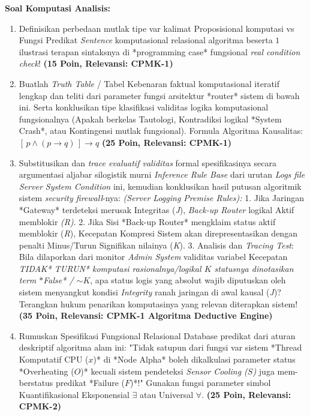 \documentclass[../main.tex]{subfiles}
\begin{document}
\textbf{Soal Komputasi Analisis:}
\begin{enumerate}
    \item Definisikan perbedaan mutlak tipe var kalimat Proposisional komputasi vs Fungsi Predikat \textit{Sentence} komputasional relasional algoritma beserta $1$ ilustrasi terapan sintaksnya di *programming case* fungsional \textit{real condition check}! \textbf{(15 Poin, Relevansi: CPMK-1)}
    \item Buatlah \textit{Truth Table} / Tabel Kebenaran faktual komputasional iteratif lengkap dan teliti dari parameter fungsi arsitektur *router* sistem di bawah ini. Serta konklusikan tipe klasifikasi validitas logika komputasional fungsionalnya (Apakah berkelas Tautologi, Kontradiksi logikal *System Crash*, atau Kontingensi mutlak fungsional).
    Formula Algoritma Kausalitas: $[\,p \land (p \rightarrow q)\,] \rightarrow q$
    \textbf{(25 Poin, Relevansi: CPMK-1)}
    \item Substitusikan dan \textit{trace evaluatif validitas} formal spesifikasinya secara argumentasi aljabar silogistik murni \textit{Inference Rule Base} dari urutan \textit{Logs file Server System Condition} ini, kemudian konklusikan hasil putusan algoritmik sistem \textit{security firewall}-nya:
    \textit{(Server Logging Premise Rules):} 
    1. Jika Jaringan *Gateway* terdeteksi merusak Integritas (\textit{J}), \textit{Back-up Router} logikal Aktif memblokir \textit{(R)}. 
    2. Jika Sisi *Back-up Router* mengklaim status aktif memblokir (\textit{R}), Kecepatan Kompresi Sistem akan direpresentasikan dengan penalti Minus/Turun Signifikan nilainya (\textit{K}). 
    3. Analisis dan \textit{Tracing Test}: Bila dilaporkan dari monitor \textit{Admin System} validitas variabel Kecepatan \textit{TIDAK* TURUN* komputasi rasionalnya/logikal $K$ statusnya dinotasikan term $*$False* / $\sim K$}, apa status logis yang absolut wajib diputuskan oleh sistem menyangkut kondisi \textit{Integrity} ranah jaringan di awal kausal (\textit{J})? Terangkan hukum penarikan komputasinya yang relevan diterapkan sistem!
    \textbf{(35 Poin, Relevansi: CPMK-1 Algoritma Deductive Engine)}
    \item Rumuskan Spesifikasi Fungsional Relasional Database predikat dari aturan deskriptif algoritma alam ini: "Tidak satupun dari fungsi var sistem *Thread Komputatif CPU ($x$)* di *Node Alpha* boleh dikalkulasi parameter status *Overheating ($O$)* kecuali sistem pendeteksi \textit{Sensor Cooling ($S$)} juga mem-berstatus predikat *Failure ($F$)*!" Gunakan fungsi parameter simbol Kuantifikasional Eksponensial $\exists$ atau Universal $\forall$.
    \textbf{(25 Poin, Relevansi: CPMK-2)}
\end{enumerate}
\end{document}
